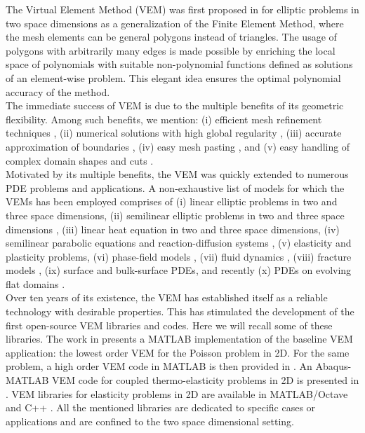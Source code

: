 \documentclass[a4paper]{article}
\begin{document}
The Virtual Element Method (VEM) was first proposed in \cite{beirao2013basic} for elliptic problems in two space dimensions as a generalization of the Finite Element Method, where the mesh elements can be general polygons instead of triangles.  The usage of polygons with arbitrarily many edges is made possible by enriching the local space of polynomials with suitable non-polynomial functions defined as solutions of an element-wise problem.  This elegant idea ensures the optimal polynomial accuracy of the method.\\
The immediate success of VEM is due to the multiple benefits of its geometric flexibility. Among such benefits, we mention: (i) efficient mesh refinement techniques \cite{cangiani2017posteriori, van2022mesh}, (ii) numerical solutions with high global regularity \cite{da2020c1,da2014virtual}, (iii) accurate approximation of boundaries 
\cite{da2019virtual, bertoluzza2019high, dassi2022bend},  (iv) easy mesh pasting \cite{da2018virtual, frittelli2018virtual}, and (v) easy handling of complex domain shapes and cuts \cite{benedetto2014virtual, dassi2022virtual}.\\
Motivated by its multiple benefits, the VEM was quickly extended to numerous PDE problems and applications. A non-exhaustive list of models for which the VEMs has been employed comprises of (i) linear elliptic problems in two \cite{beirao2013basic, da2019virtual} and three \cite{da2017high} space dimensions,  (ii) semilinear elliptic problems in two and three space dimensions \cite{xiao2022nonconforming}, (iii) linear heat equation in two \cite{vacca2015virtual} and three \cite{zhao2019nonconforming} space dimensions, (iv) semilinear parabolic equations \cite{adak2019convergence} and reaction-diffusion systems \cite{huang2021posteriori}, (v) elasticity \cite{da2013virtual, gain2014virtual} and plasticity \cite{aldakheel2019virtual} problems,  (vi) phase-field models \cite{aldakheel2018phase, antonietti2016c}, (vii) fluid dynamics \cite{adak2021virtual, beirao2019stokes},
(viii) fracture models \cite{benedetto2014virtual}, 
(ix) surface \cite{bachini2021arbitrary, frittelli2018virtual} and bulk-surface \cite{frittelli2021bulk,  frittelli2023bsrds, frittelli2023elliptic} PDEs, and recently (x) PDEs on evolving flat domains \cite{wells2022velocitybased}.\\
%
Over ten years of its existence, the VEM has established itself as a reliable technology with desirable properties. This has stimulated the development of the first open-source VEM libraries and codes.  Here we will recall some of these libraries.  The  work in \cite{Sutton_2016} presents a MATLAB implementation of the baseline VEM application: the lowest order VEM for the Poisson problem in 2D. For the same problem, a high order VEM code in MATLAB is then provided in \cite{Herrera_2022}. An Abaqus-MATLAB VEM code for coupled thermo-elasticity problems in 2D is presented in \cite{Dhanush_2018}.  VEM libraries for elasticity problems in 2D are available in MATLAB/Octave \cite{VEMLAB} and C++ \cite{Ortiz_Bernardin_2019}. All the mentioned libraries are dedicated to specific cases or applications and are confined to the two space dimensional setting. \\
\end{document}
